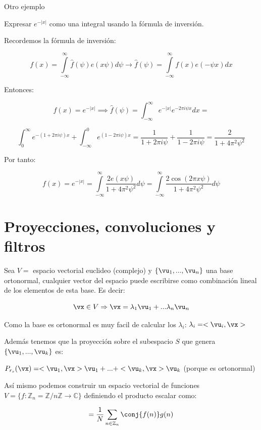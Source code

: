 \begin{example}{Otro ejemplo}

Expresar $e^{-|x|}$ como una integral usando la fórmula de inversión.


Recordemos la fórmula de inversión:

$$ f(x) = \int\limits^{\infty}_{-\infty} \hat{f}(\psi) e(x\psi) d\psi \rightarrow \hat{f}(\psi) = \int\limits^{\infty}_{-\infty} f(x) e(-\psi x) dx$$

Entonces:

$$f(x) = e^{-|x|} \implies \hat{f}(\psi) = \int_{-\infty}^{\infty} e^{-|x|} e ^{-2 \pi i \psi x} dx = $$

$$ \int_{0}^{\infty} e ^{-(1 + 2 \pi i \psi) x} + \int_{-\infty}^{0} e ^{(1 - 2 \pi i \psi) x} = \frac{1}{1 + 2\pi i \psi} + \frac{1}{1-2 \pi i \psi} = \frac{2}{1 + 4 \pi^2 \psi^2}$$

Por tanto:

$$f(x)=e^{-|x|} = \int\limits_{-\infty}^{\infty} \frac{2 e (x \psi)}{1 + 4 \pi^2 \psi^2} d \psi = \int\limits^{\infty}_{-\infty} \frac{2 \cos(2 \pi x \psi)}{1 + 4 \pi^2 \psi^2} d\psi $$

\end{example}

\section{Proyecciones, convoluciones y filtros}

Sea $V =$ espacio vectorial euclideo (complejo) y $\{\vu_1, ..., \vu_n\}$ una base ortonormal, cualquier vector del espacio puede escribirse como combinación lineal de los elementos de esta base. Es decir:

\[\vx \in V \Rightarrow \vx = \lambda_1 \vu_1 + ... \lambda_n \vu_n\]

Como la base es ortonormal es muy facil de calcular los $\lambda_i$: $\lambda_i = <\vu_i, \vx>$

Además tenemos que la proyección sobre el subespacio $S$ que genera $\{\vu_1,...,\vu_k\}$ es:

$ P_{r_s}(\vx) = <\vu_1, \vx>\vu_1 + ... + <\vu_k, \vx>\vu_k $ (porque es ortonormal)

Así mismo podemos construir un espacio vectorial de funciones $ V = \{f: \mathbb{Z}_n = \mathbb{Z}/n\mathbb{Z} \rightarrow \mathbb{C} \} $ definiendo el producto escalar como:

\[<f, g> = \frac{1}{N} \sum_{n \in \mathbb{Z}_n} \conj{f(n)} g(n)\]


